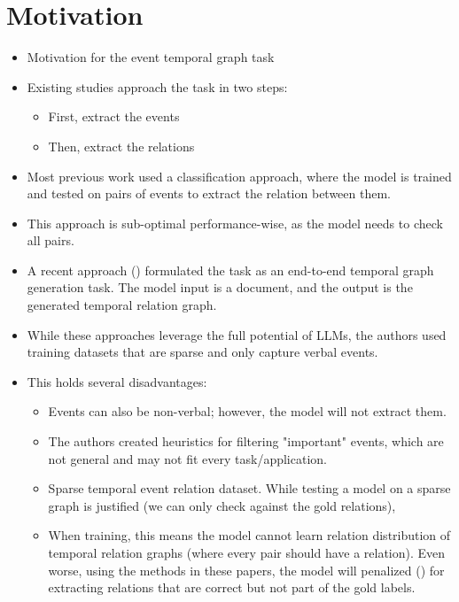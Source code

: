 \section{Motivation}
\begin{itemize}
    \item Motivation for the event temporal graph task
    \item Existing studies approach the task in two steps:
    \begin{itemize}
        \item First, extract the events
        \item Then, extract the relations
    \end{itemize}
    \item Most previous work used a classification approach, where the model is trained and tested on pairs of events to extract the relation between them.
    \item This approach is sub-optimal performance-wise, as the model needs to check all pairs.
    \item A recent approach () formulated the task as an end-to-end temporal graph generation task. The model input is a document, and the output is the generated temporal relation graph.
    \item While these approaches leverage the full potential of LLMs, the authors used training datasets that are sparse and only capture verbal events.
    \item This holds several disadvantages:
    \begin{itemize}
        \item Events can also be non-verbal; however, the model will not extract them.
        \item The authors created heuristics for filtering "important" events, which are not general and may not fit every task/application.
        \item Sparse temporal event relation dataset. While testing a model on a sparse graph is justified (we can only check against the gold relations),
        \item When training, this means the model cannot learn relation distribution of temporal relation graphs (where every pair should have a relation). Even worse, using the methods in these papers, the model will penalized () for extracting relations that are correct but not part of the gold labels.

\end{itemize}
\end{itemize}
